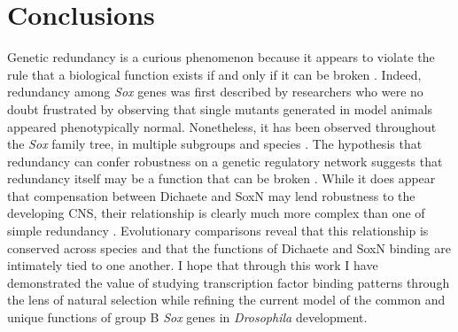 \section{Conclusions}
Genetic redundancy is a curious phenomenon because it appears to violate the rule that a biological function exists if and only if it can be broken \citep{graur_immortality_2013}. Indeed, redundancy among \emph{Sox} genes was first described by researchers who were no doubt frustrated by observing that single mutants generated in model animals appeared phenotypically normal. Nonetheless, it has been observed throughout the \emph{Sox} family tree, in multiple subgroups and species \citep{bhattaram_organogenesis_2010,ferri_sox2_2004,matsui_redundant_2006,nishiguchi_sox1_1998,okuda_b1_2010,rizzoti_sox3_2004}. The hypothesis that redundancy can confer robustness on a genetic regulatory network suggests that redundancy itself may be a function that can be broken \citep{nowak_evolution_1997,tautz_redundancies_1992,wagner_distributed_2005,wagner_gene_2008}. While it does appear that compensation between Dichaete and SoxN may lend robustness to the developing CNS, their relationship is clearly much more complex than one of simple redundancy \citep{ferrero_soxneuro_2014}. Evolutionary comparisons reveal that this relationship is conserved across species and that the functions of Dichaete and SoxN binding are intimately tied to one another. I hope that through this work I have demonstrated the value of studying transcription factor binding patterns through the lens of natural selection while refining the current model of the common and unique functions of group B \emph{Sox} genes in \emph{Drosophila} development.\\

